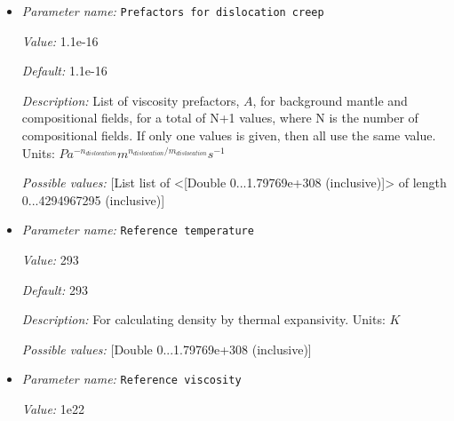 \begin{itemize}
{\it Value:} 1.5e-15


{\it Default:} 1.5e-15


{\it Description:} List of viscosity prefactors, $A$, for background mantle and compositional fields, for a total of N+1 values, where N is the number of compositional fields. If only one values is given, then all use the same value. Units: $Pa^{-n_{diffusion}} m^{n_{diffusion}/m_{diffusion}} s^{-1}$


{\it Possible values:} [List list of <[Double 0...1.79769e+308 (inclusive)]> of length 0...4294967295 (inclusive)]
\item {\it Parameter name:} {\tt Prefactors for dislocation creep}
\label{parameters:Material model/Diffusion dislocation/Prefactors for dislocation creep}


{\it Value:} 1.1e-16


{\it Default:} 1.1e-16


{\it Description:} List of viscosity prefactors, $A$, for background mantle and compositional fields, for a total of N+1 values, where N is the number of compositional fields. If only one values is given, then all use the same value. Units: $Pa^{-n_{dislocation}} m^{n_{dislocation}/m_{dislocation}} s^{-1}$


{\it Possible values:} [List list of <[Double 0...1.79769e+308 (inclusive)]> of length 0...4294967295 (inclusive)]
\item {\it Parameter name:} {\tt Reference temperature}
\label{parameters:Material model/Diffusion dislocation/Reference temperature}


{\it Value:} 293


{\it Default:} 293


{\it Description:} For calculating density by thermal expansivity. Units: $K$


{\it Possible values:} [Double 0...1.79769e+308 (inclusive)]
\item {\it Parameter name:} {\tt Reference viscosity}
\label{parameters:Material model/Diffusion dislocation/Reference viscosity}


{\it Value:} 1e22



\end{itemize}
